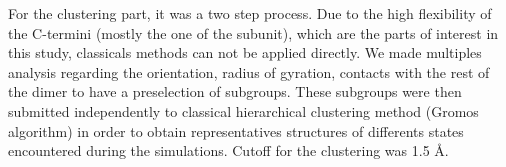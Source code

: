 \documentclass[a4paper]{article}
\begin{document}
For the clustering part, it was a two step process. Due to the high flexibility of the C-termini (mostly the one of
the \beta subunit), which are the parts of interest in this study, classicals methods can not be applied directly.
We made multiples analysis regarding the orientation, radius of gyration, contacts with the rest of the dimer to have
a preselection of subgroups. These subgroups were then submitted independently to classical hierarchical clustering
method (Gromos algorithm) in order to obtain representatives structures of differents states encountered during the
simulations. Cutoff for the clustering was 1.5 {\AA}.



%
%
\end{document}
